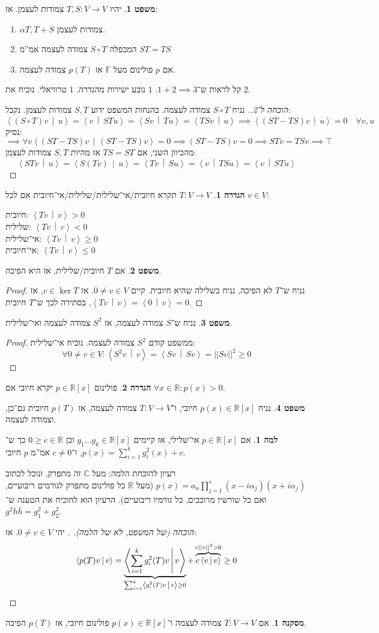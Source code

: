 \documentclass[a4paper]{article}
\newcommand\R     {\mathbb{R}}
\newcommand\C     {\mathbb{C}}
\newcommand\ra    {\rangle}
\newcommand\la    {\langle}
\newcommand\F         {\mathbb{F}}
\newcommand\co        {\colon}
\newcommand\norm[1]   {\left \vert \left \vert #1 \right \vert \right \vert}
\newcommand\mut [2]   {\left \la #1 \,\middle|\, #2 \right \ra}
\newcommand\ag        {\alpha}
\theoremstyle{definition}
\newtheorem{Theorem}{\color{myblue}משפט}
\newtheorem{Definition}{\color{mygreen}הגדרה}
\newtheorem{Lemma}{\color{myyellow}למה}
\newtheorem{Collary}{\color{mymagenta}מסקנה}
\newcommand\cola [1] {\begin{Collary}#1\end{Collary}}
\newcommand\theo  [1] {\begin{Theorem}#1\end{Theorem}}
\newcommand\defi  [1] {\begin{Definition}#1\end{Definition}}
\newcommand\lem   [1] {\begin{Lemma}#1\end{Lemma}}
\begin{document}
	\theo{יהיו $T, S \co V \to V$ צמודות לעצמן. אז: 
		\begin{enumerate}
			\item $\ag T, T + S$ צמודות לעצמן. 
			\item המכפלה $S\circ T$ צמודה לעצמה אמ''מ $ST = TS$
			\item אם $p$ פולינום מעל $\F$ אז $p(T)$ צמודה לעצמה. 
	\end{enumerate}}
	קל לראות ש־$1 + 2 \implies 3$. $1$ נובע ישירות מהגדרה. $1$ טרוויאלי. נוכיח את $2$. \begin{proof}[הוכחה ל־2.]
		נניח $S \circ T$ צמודה לעצמה. בהנחות המשפט ידוע $S, T$ צמודות לעצמן. נקבל: 
		\[ \mut{(S \circ T)v}{u} = \mut{v}{STu} = \mut{Sv}{Tu} = \mut{TSv}{u} \implies \mut{(ST - TS)v}{u} = 0 \quad \forall v, u \]
		נסיק: 
		\[ \implies \forall v\mut{(ST - TS)v}{(ST - TS)v} = 0  \implies (ST - TS)v = 0 \implies STv = TSv \implies \top \]
		מהכיוון השני, אם $TS = ST$ אז מהיות $S, T$ צמודות לעצמן: 
		\[ \mut{STv}{u} = \mut{S(Tv)}{u} = \mut{Tv}{Su} = \mut{v}{TSu} = \mut{v}{STu} \]
	\end{proof}
	\defi{$T \co V \to V$ תקרא חיובית/אי־שלילית/שלילית/אי־חיובית אם לכל $v \in V$: 
		\begin{multicols}{2}
				 חיובית: $\mut{Tv}{v} > 0$ \\
				שלילית: $\mut{Tv}{v} < 0$ \\
				אי־שלילית: $\mut{Tv}{v} \ge 0$ \\
				אי־חיובית: $\mut{Tv}{v} \le 0$
		\end{multicols}
	}
	\theo{אם $T$ חיובית/שלילית, אז היא הפיכה. } \begin{proof}
		נניח ש־$T$ לא הפיכה, נניח בשלילה שהיא חיובית. קיים $0 \neq v \in V$. אז $v \in \ker T$, אז $\mut{Tv}{v} = \mut{0}{v} = 0$, בסתירה לכך ש־$T$ חיובית. 
	\end{proof}
	\theo{נניח ש־$S$ צמודה לעצמה, אז $S^{2}$ צמודה לעצמה ואי־שלילית. }
	\begin{proof}
		ממשפט קודם $S^{2}$ צמודה לעצמה. נוכיח אי־שלילית: 
		\[ \forall 0 \neq v \in V \co \mut{S^{2}v}{v} = \mut{Sv}{Sv} = \norm{Sv}^{2} \ge 0 \]
	\end{proof}
	\defi{פולינום $p \in \R[x]$ יקרא חיובי אם $\forall x \in \R\co p(x) > 0$. }
	\theo{נניח $p(x) \in \R[x]$ חיובי, ו־$T \co V \to V$ צמודה לעצמה, אז $p(T)$ חיובית גם־כן, וצמודה לעצמה. }
	\lem{אם $p \in \R[x]$ אי־שלילי, אז קיימים $g_1 \dots g_k \in \R[x]$ וכן $0 \ge c \in \R$ כך ש־$p(x) = \sum_{i = 1}^{k}g^2_i(x) + c$, ו־$c \neq 0$ אמ''מ $p$ חיובי. }
	רעיון להוכחת הלמה: מעל $\C$ זה מתפרק, ונוכל לכתוב $p(x) = a_n\prod_{j = 1}^{s} (x - i\ag_j)(x + i\ag_j)$ (מעל $\R$ כל פולינום מתפרק לגורמים ריבועיים, ואם כל שורשיו מרוכבים, כל גורמיו ריבועיים). הרעיון הוא להוכיח את הטענה ש־$g^2 h \bar h = g_1^2 + g_2^2$.
	\begin{proof}[הוכחה (של המשפט, לא של הלמה). ]
		יהי $0 \neq v \in V$. אז: 
		\[ \mut{p(T)v}{v} = \underbrace{\mut{\sum_{i = 1}^{k}g_i^2(T)v}{v}}_{\mathclap{\sum_{i = 1}^{k} \mut{g_i^2(T)v}{v}\ge 0}} + \overbrace{c\mut{v}{v}}^{c\norm{v}^2 > 0} \ge 0 \]
	\end{proof}
	\cola{אם $T \co V \to V$ צמודה לעצמה ו־$p(x) \in \R[x]$ פולינום חיובי, אז $p(T)$ הפיכה. }
	
\end{document}
